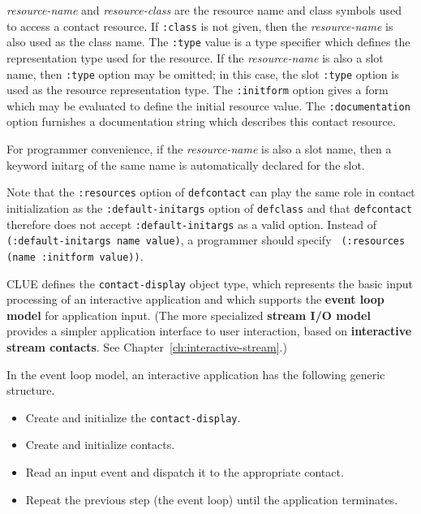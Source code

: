 {\em resource-name} and {\em resource-class} are the resource name and class
symbols used to access a contact resource.  
If {\tt :class} is not given, then
the {\em resource-name} is also used as the class name.
The {\tt :type} value is a type specifier which defines the representation type
used for the resource.
If the {\em resource-name} is also a slot name, then {\tt :type} option may
be omitted; in this case,
the slot {\tt :type} option is used as the resource representation type.
The {\tt :initform} option gives a form which may be evaluated to define the
initial resource value. The {\tt :documentation} option furnishes a
documentation string which describes this contact resource.

For programmer convenience, if the {\em resource-name} is also a slot name, then
a keyword initarg of the same name is automatically declared for the
slot.


Note that the {\tt :resources} option of {\tt defcontact} can play the
same role in contact initialization as the {\tt :default-initargs}
option of {\tt defclass} and that {\tt defcontact} therefore does not
accept {\tt :default-initargs} as a valid option.  Instead of {\tt
(:default-initargs name value)}, a programmer should specify {\tt
(:resources (name :initform value))}.




CLUE defines the {\tt contact-display} object type, which represents the
basic input processing of an interactive application and which supports the {\bf
event loop model} for application input. (The
more specialized 
{\bf stream I/O model} provides a simpler application
interface to user interaction, based on {\bf interactive stream
contacts}. See
Chapter~\ref{ch:interactive-stream}.)

In the event loop model, an interactive application has the following generic
structure.  
\begin{itemize}
\item Create and initialize the {\tt contact-display}.
\item Create and initialize contacts.
\item Read an input event and dispatch it to the appropriate contact. 
\item Repeat the previous step (the event loop) until the application terminates.
\end{itemize}

